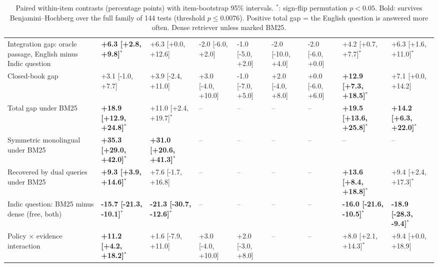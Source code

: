 \begin{table}[t]
{\begin{tabular}{p{5.6cm}llllllll}
Integration gap: oracle passage, English minus Indic question & \textbf{+6.3 [+2.8, +9.8]$^{*}$} & +6.3 [+0.0, +12.6] & -2.0 [-6.0, +2.0] & -1.0 [-5.0, +2.0] & -2.0 [-10.0, +4.0] & -2.0 [-6.0, +0.0] & +4.2 [+0.7, +7.7]$^{*}$ & +6.3 [+1.6, +11.0]$^{*}$ \\
Closed-book gap & +3.1 [-1.0, +7.7] & +3.9 [-2.4, +11.0] & +3.0 [-4.0, +10.0] & -1.0 [-7.0, +5.0] & +2.0 [-4.0, +8.0] & +0.0 [-6.0, +6.0] & \textbf{+12.9 [+7.3, +18.5]$^{*}$} & +7.1 [+0.0, +14.2] \\
Total gap under BM25 & \textbf{+18.9 [+12.9, +24.8]$^{*}$} & +11.0 [+2.4, +19.7]$^{*}$ & -- & -- & -- & -- & \textbf{+19.5 [+13.6, +25.8]$^{*}$} & \textbf{+14.2 [+6.3, +22.0]$^{*}$} \\
Symmetric monolingual under BM25 & \textbf{+35.3 [+29.0, +42.0]$^{*}$} & \textbf{+31.0 [+20.6, +41.3]$^{*}$} & -- & -- & -- & -- & -- & -- \\
Recovered by dual queries under BM25 & \textbf{+9.3 [+3.9, +14.6]$^{*}$} & +7.6 [-1.7, +16.8] & -- & -- & -- & -- & \textbf{+13.6 [+8.4, +18.8]$^{*}$} & +9.4 [+2.4, +17.3]$^{*}$ \\
Indic question: BM25 minus dense (free, both) & \textbf{-15.7 [-21.3, -10.1]$^{*}$} & \textbf{-21.3 [-30.7, -12.6]$^{*}$} & -- & -- & -- & -- & \textbf{-16.0 [-21.6, -10.5]$^{*}$} & \textbf{-18.9 [-28.3, -9.4]$^{*}$} \\
\midrule
Policy $\times$ evidence interaction & \textbf{+11.2 [+4.2, +18.2]$^{*}$} & +1.6 [-7.9, +11.0] & +3.0 [-4.0, +10.0] & +2.0 [-3.0, +8.0] & -- & -- & +8.0 [+2.1, +14.3]$^{*}$ & +9.4 [+0.0, +18.9] \\
\bottomrule
\end{tabular}}
\caption{Paired within-item contrasts (percentage points) with item-bootstrap 95\% intervals. $^{*}$: sign-flip permutation $p<0.05$. Bold: survives Benjamini--Hochberg over the full family of 144 tests (threshold $p \le 0.0076$). Positive total gap = the English question is answered more often. Dense retriever unless marked BM25.}
\label{tab:main}
\end{table}
